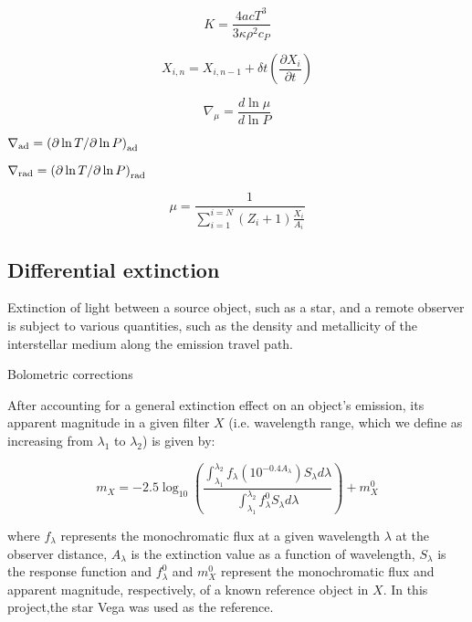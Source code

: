 \documentclass{mnras}
\begin{document}
\begin{equation}
K = \frac{4acT^{3}}{3\kappa\rho ^{2}c_{P}}
\label{diffusivity_def}
\end{equation}

\begin{equation}
X_{i,n} = X_{i,n-1} + \delta t \left( \frac{\partial X_{i}}{\partial t}\right)
\label{iter_timeind}
\end{equation}

\begin{equation}
\nabla _{\mu} = \frac{d\ln\mu}{d\ln P}
\label{del_mu_def}
\end{equation}


$\nabla _{\textnormal{ad}} = \left(\partial\ln T / \partial\ln P \right)_{\textnormal{ad}}$

$\nabla _{\textnormal{rad}} = \left(\partial\ln T / \partial\ln P \right)_{\textnormal{rad}}$

\begin{equation}
\mu = \frac{1}{\sum_{i=1}^{i=N} (Z_{i}+1) \frac{X_{i}}{A_{i}}}
\label{mol_weight_def}
\end{equation}



\subsection{Differential extinction}
Extinction of light between a source object, such as a star, and a remote observer is subject to various quantities, such as the density and metallicity of the interstellar medium along the emission travel path.

Bolometric corrections

After accounting for a general extinction effect on an object's emission, its apparent magnitude in a given filter $X$ (i.e. wavelength range, which we define as increasing from $\lambda _{1}$ to $\lambda _{2}$) is given by:

\begin{equation}
m_{X} = -2.5 \log_{10} \left(\frac{ \int_{\lambda_{1}}^{\lambda_{2}} f_{\lambda} \left( 10^{-0.4 A_{\lambda}} \right) S_{\lambda} d\lambda }{ \int_{\lambda_{1}}^{\lambda_{2}} f_{\lambda}^{0} S_{\lambda} d\lambda }\right) + m_{X}^{0}
\label{app_mag_def}
\end{equation}

where $f_{\lambda}$ represents the monochromatic flux at a given wavelength $\lambda$ at the observer distance, $A_{\lambda}$ is the extinction value as a function of wavelength, $S_{\lambda}$ is the response function and $f_{\lambda}^{0}$ and $m_{X}^{0}$ represent the monochromatic flux and apparent magnitude, respectively, of a known reference object in $X$. In this project,the star Vega was used as the reference.
\end{document}
